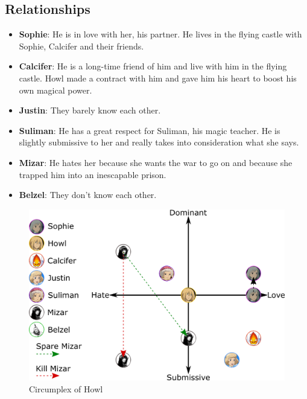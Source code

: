 \subsection{Relationships}
\begin{itemize}
\item \textbf{Sophie}: He is in love with her, his partner. He lives in the flying castle with Sophie, Calcifer and their friends.
\item \textbf{Calcifer}: He is a long-time friend of him and live with him in the flying castle. Howl made a contract with him and gave him his heart to boost his own magical power.
\item \textbf{Justin}: They barely know each other.
\item \textbf{Suliman}: He has a great respect for Suliman, his magic teacher. He is slightly submissive to her and really takes into consideration what she says.
\item \textbf{Mizar}: He hates her because she wants the war to go on and because she trapped him into an inescapable prison.
\item \textbf{Belzel}: They don't know each other.
\end{itemize}

\begin{figure}[H]
  \centering
  \includegraphics[width=14cm]{Images/Diagrams/Circumplexes/howlCircumplex}
  \caption{Circumplex of Howl}
\end{figure}

